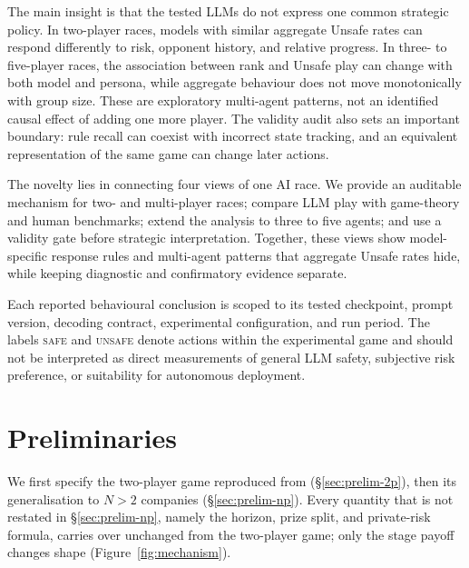 \documentclass[sigconf]{aamas}
\newcommand{\Safe}{\textsc{safe}}
\newcommand{\Unsafe}{\textsc{unsafe}}
\begin{document}
The main insight is that the tested LLMs do not express one common strategic
policy. In two-player races, models with similar aggregate Unsafe rates can
respond differently to risk, opponent history, and relative progress. In
three- to five-player races, the association between rank and Unsafe play can
change with both model and persona, while aggregate behaviour does not move
monotonically with group size. These are exploratory multi-agent patterns, not
an identified causal effect of adding one more player. The validity audit also
sets an important boundary: rule recall can coexist with incorrect state
tracking, and an equivalent representation of the same game can change later
actions.


The novelty lies in connecting four views of one AI race. We provide an
auditable mechanism for two- and multi-player races; compare LLM play with
game-theory and human benchmarks; extend the analysis to three to five agents;
and use a validity gate before strategic interpretation. Together, these views
show model-specific response rules and multi-agent patterns that aggregate
Unsafe rates hide, while keeping diagnostic and confirmatory evidence separate.

Each reported behavioural conclusion is scoped to its tested checkpoint,
prompt version, decoding contract, experimental configuration, and run
period. The labels \Safe{} and \Unsafe{} denote actions within the experimental game and should not be interpreted as direct measurements of general LLM safety, subjective risk preference, or suitability for autonomous deployment.

\section{Preliminaries}
\label{sec:preliminaries}

We first specify the two-player game reproduced from \citet{falling_behind_unsafe} (\S\ref{sec:prelim-2p}), then its generalisation to $N>2$ companies (\S\ref{sec:prelim-np}). Every quantity that is not restated in \S\ref{sec:prelim-np}, namely the horizon, prize split, and private-risk formula, carries over unchanged from the two-player game; only the stage payoff changes shape (Figure~\ref{fig:mechanism}).

\end{document}
